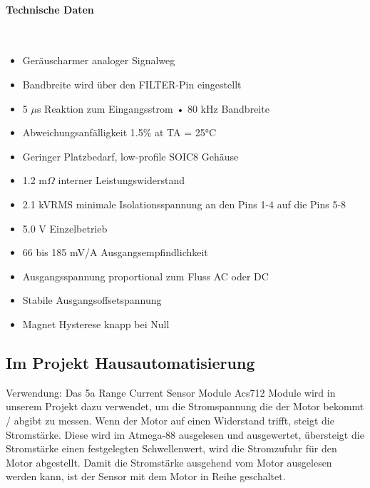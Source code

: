 \paragraph{Technische Daten}\mbox{}\\
\begin{itemize}
\item Geräuscharmer analoger Signalweg
\item Bandbreite wird über den FILTER-Pin eingestellt
\item 5 $\mu$s Reaktion zum Eingangsstrom • 80 kHz Bandbreite
\item Abweichungsanfälligkeit 1.5\% at TA = 25°C
\item Geringer Platzbedarf, low-profile SOIC8 Gehäuse
\item 1.2 m$\Omega$ interner Leistungswiderstand
\item 2.1 kVRMS minimale Isolationsspannung an den Pins 1-4 auf die Pins 5-8
\item 5.0 V Einzelbetrieb
\item 66 bis 185 mV/A Ausgangsempfindlichkeit
\item Ausgangsspannung proportional zum Fluss AC oder DC
\item Stabile Ausgangsoffsetspannung
\item Magnet Hysterese knapp bei Null
\end{itemize}


\subsection{Im Projekt Hausautomatisierung}
Verwendung: Das 5a Range Current Sensor Module Acs712 Module wird in unserem Projekt dazu verwendet, um die Stromspannung die der Motor bekommt / abgibt zu messen. Wenn der Motor auf einen Widerstand trifft, steigt die Stromstärke. Diese wird im Atmega-88 ausgelesen und ausgewertet, übersteigt die Stromstärke einen festgelegten Schwellenwert, wird die Stromzufuhr für den Motor abgestellt. Damit die Stromstärke ausgehend vom Motor ausgelesen werden kann, ist der Sensor mit dem Motor in Reihe geschaltet.